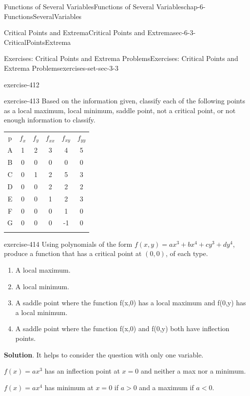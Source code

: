 \documentclass[oneside,10pt,]{book}
\numberwithin{equation}{section}
\newcommand{\hrulethin}  {\noalign{\hrule height 0.04em}}
\newcommand{\hrulethick} {\noalign{\hrule height 0.11em}}
\newcommand{\lt}{<}
\newcommand{\gt}{>}
\begin{document}
\begin{chapterptx}{Functions of Several Variables}{}{Functions of Several Variables}{}{}{chap-6-FunctionsSeveralVariables}
\begin{sectionptx}{Critical Points and Extrema}{}{Critical Points and Extrema}{}{}{sec-6-3-CriticalPointsExtrema}
\begin{exercises-subsection-numberless}{Exercises: Critical Points and Extrema Problems}{}{Exercises: Critical Points and Extrema Problems}{}{}{exercises-set-sec-3-3}
\begin{divisionexercise}{7}{}{}{exercise-412}
\end{divisionexercise}%
\begin{divisionexercise}{8}{}{}{exercise-413}%
\hypertarget{p-2423}{}%
Based on the information given, classify each of the following points as a local maximum, local minimum, saddle point, not a critical point, or not enough information to classify.%
\begin{sidebyside}{1}{0}{0}{0}%
\begin{sbspanel}{1}%
{\centering%
\begin{tabular}{cccccc}\hrulethick
p&\(f_x\)&\(f_y\)&\(f_{xx}\)&\(f_{xy}\)&\(f_{yy}\)\tabularnewline\hrulethin
A&1&2&3&4&5\tabularnewline\hrulethin
B&0&0&0&0&0\tabularnewline\hrulethin
C&0&1&2&5&3\tabularnewline\hrulethin
D&0&0&2&2&2\tabularnewline\hrulethin
E&0&0&1&2&3\tabularnewline\hrulethin
F&0&0&0&1&0\tabularnewline\hrulethin
G&0&0&0&-1&0\tabularnewline\hrulethin
\end{tabular}
\par}
\end{sbspanel}%
\end{sidebyside}%
\end{divisionexercise}%
\begin{divisionexercise}{9}{}{}{exercise-414}%
\hypertarget{p-2424}{}%
Using polynomials of the form \(f(x,y)=ax^3+bx^4+cy^3+dy^4\), produce a function that has a critical point at \((0, 0)\), of each type.%
\leavevmode%
\begin{enumerate}[label=(\arabic*)]
\item\hypertarget{li-668}{}\hypertarget{p-2425}{}%
A local maximum.%
\item\hypertarget{li-669}{}\hypertarget{p-2426}{}%
A local minimum.%
\item\hypertarget{li-670}{}\hypertarget{p-2427}{}%
A saddle point where the function f(x,0)  has a local maximum and f(0,y)  has a local minimum.%
\item\hypertarget{li-671}{}\hypertarget{p-2428}{}%
A saddle point where the function f(x,0)  and f(0,y)  both have inflection points.%
\end{enumerate}
\par\smallskip%
\noindent\textbf{Solution}.\hypertarget{solution-209}{}\quad%
\hypertarget{p-2429}{}%
It helps to consider the question with only one variable.%
\par
\hypertarget{p-2430}{}%
\(f(x)=ax^3\) has an inflection point at \(x=0\) and neither a max nor a minimum.%
\par
\hypertarget{p-2431}{}%
\(f(x)=ax^4\) has minimum at \(x=0\) if \(a\gt 0\) and a maximum if \(a\lt 0\).%

\end{divisionexercise}
\end{exercises-subsection-numberless}
\end{sectionptx}
\end{chapterptx}
\end{document}
